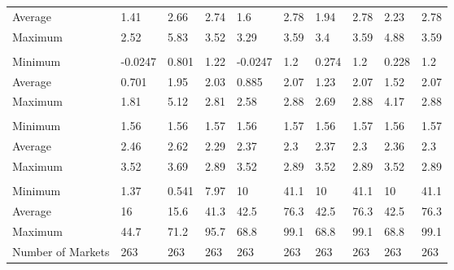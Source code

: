 \begin{tabular}[t]{llllllllll}
\hspace{1em}Average & 1.41 & 2.66 & 2.74 & 1.6 & 2.78 & 1.94 & 2.78 & 2.23 & 2.78\\
\hspace{1em}Maximum & 2.52 & 5.83 & 3.52 & 3.29 & 3.59 & 3.4 & 3.59 & 4.88 & 3.59\\
\addlinespace[0.3em]
\multicolumn{10}{l}{\textbf{Marginal Cost}}\\
\hspace{1em}Minimum & -0.0247 & 0.801 & 1.22 & -0.0247 & 1.2 & 0.274 & 1.2 & 0.228 & 1.2\\
\hspace{1em}Average & 0.701 & 1.95 & 2.03 & 0.885 & 2.07 & 1.23 & 2.07 & 1.52 & 2.07\\
\hspace{1em}Maximum & 1.81 & 5.12 & 2.81 & 2.58 & 2.88 & 2.69 & 2.88 & 4.17 & 2.88\\
\addlinespace[0.3em]
\multicolumn{10}{l}{\textbf{Miles Flown}}\\
\hspace{1em}Minimum & 1.56 & 1.56 & 1.57 & 1.56 & 1.57 & 1.56 & 1.57 & 1.56 & 1.57\\
\hspace{1em}Average & 2.46 & 2.62 & 2.29 & 2.37 & 2.3 & 2.37 & 2.3 & 2.36 & 2.3\\
\hspace{1em}Maximum & 3.52 & 3.69 & 2.89 & 3.52 & 2.89 & 3.52 & 2.89 & 3.52 & 2.89\\
\addlinespace[0.3em]
\multicolumn{10}{l}{\textbf{Origin Service Ratio}}\\
\hspace{1em}Minimum & 1.37 & 0.541 & 7.97 & 10 & 41.1 & 10 & 41.1 & 10 & 41.1\\
\hspace{1em}Average & 16 & 15.6 & 41.3 & 42.5 & 76.3 & 42.5 & 76.3 & 42.5 & 76.3\\
\hspace{1em}Maximum & 44.7 & 71.2 & 95.7 & 68.8 & 99.1 & 68.8 & 99.1 & 68.8 & 99.1\\
\midrule
Number of Markets & 263 & 263 & 263 & 263 & 263 & 263 & 263 & 263 & 263\\
\bottomrule
\end{tabular}
